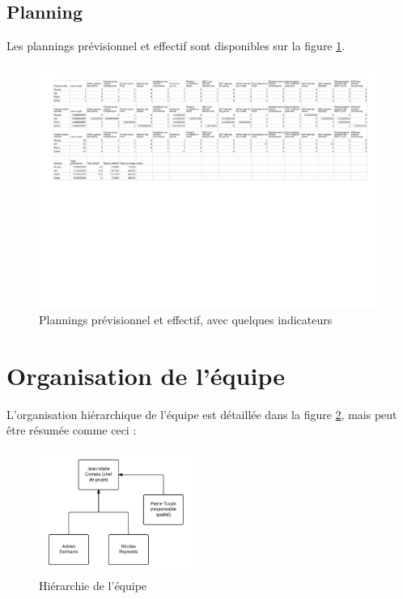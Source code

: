 \subsection{Planning}

Les plannings prévisionnel et effectif sont disponibles sur la figure
\ref{fig:plannings}.

\begin{landscape}
 \begin{figure}[ht]
    \centering
    \includegraphics[width=0.7\paperheight]{plannings}
    \caption{Plannings prévisionnel et effectif, avec quelques indicateurs}
    \label{fig:plannings}
    \end{figure}
 \end{landscape}

\section{Organisation de l'équipe}

L'organisation hiérarchique de l'équipe est détaillée dans la figure
\ref{fig:hierarchie}, mais peut être résumée comme ceci :

\begin{figure}
    \centering
    \includegraphics[width=0.45\textwidth]{hierarchie}
    \caption{Hiérarchie de l'équipe}
    \label{fig:hierarchie}
\end{figure}

